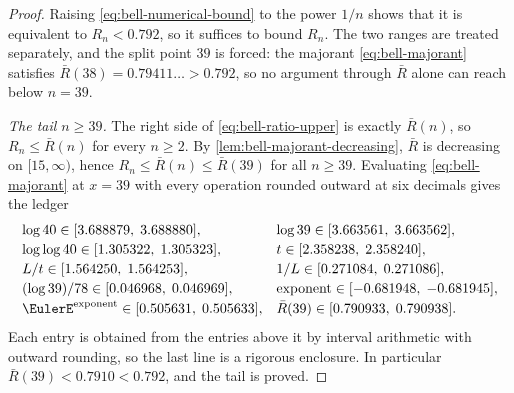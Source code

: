 \documentclass[11pt,a4paper,oneside,openany]{book}
\theoremstyle{definition}
\theoremstyle{remark}
\begin{document}
\begin{proof}
Raising \eqref{eq:bell-numerical-bound} to the power $1/n$ shows that it is
equivalent to $R_n<0.792$, so it suffices to bound $R_n$.  The two ranges are
treated separately, and the split point $39$ is forced: the majorant
\eqref{eq:bell-majorant} satisfies $\bar R(38)=0.79411\ldots>0.792$, so no
argument through $\bar R$ alone can reach below $n=39$.

\emph{The tail $n\ge39$.}  The right side of \cref{eq:bell-ratio-upper} is
exactly $\bar R(n)$, so $R_n\le\bar R(n)$ for every $n\ge2$.  By
\cref{lem:bell-majorant-decreasing}, $\bar R$ is decreasing on $[15,\infty)$,
hence $R_n\le\bar R(n)\le\bar R(39)$ for all $n\ge39$.  Evaluating
\eqref{eq:bell-majorant} at $x=39$ with every operation rounded outward at six
decimals gives the ledger
\[
 \begin{array}{ll}
  \log40\in[3.688879,\;3.688880], &
  \log39\in[3.663561,\;3.663562],\\[2pt]
  \log\log40\in[1.305322,\;1.305323], &
  t\in[2.358238,\;2.358240],\\[2pt]
  L/t\in[1.564250,\;1.564253], &
  1/L\in[0.271084,\;0.271086],\\[2pt]
  (\log39)/78\in[0.046968,\;0.046969], &
  \text{exponent}\in[-0.681948,\;-0.681945],\\[2pt]
  \EulerE^{\text{exponent}}\in[0.505631,\;0.505633], &
  \bar R(39)\in[0.790933,\;0.790938].
 \end{array}
\]
Each entry is obtained from the entries above it by interval arithmetic with
outward rounding, so the last line is a rigorous enclosure.  In particular
$\bar R(39)<0.7910<0.792$, and the tail is proved.


\end{proof}
\end{document}

